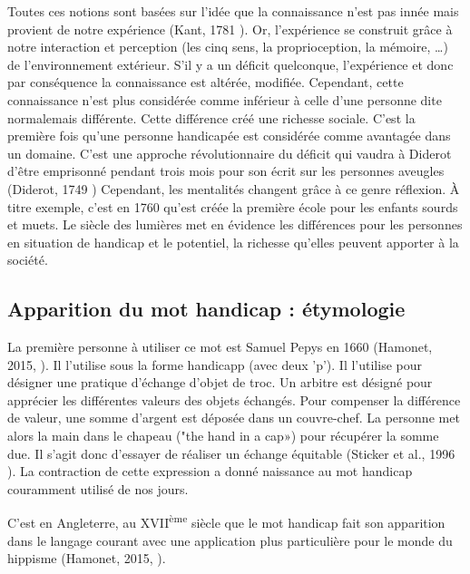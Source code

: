 Toutes ces notions sont basées sur l’idée que la connaissance n’est pas innée mais provient de notre expérience (Kant, 1781 \cite{Kant1781}). Or, l'expérience se construit grâce à notre interaction et perception (les cinq sens, la proprioception, la mémoire, …) de l’environnement extérieur. S’il y a un déficit quelconque, l'expérience et donc par conséquence la connaissance est altérée, modifiée.
Cependant, cette connaissance n’est plus considérée comme inférieur à celle d’une personne dite \og normale\fg mais différente. Cette différence créé une richesse sociale. C’est la première fois qu’une personne handicapée est considérée comme avantagée dans un domaine. C’est une approche révolutionnaire du déficit qui vaudra à Diderot d’être emprisonné pendant trois mois pour son écrit sur les personnes aveugles (Diderot, 1749 \cite{Diderot1749}) Cependant, les mentalités changent grâce à ce genre réflexion. À titre exemple, c'est en 1760 qu'est créée la première école pour les enfants sourds et muets. Le siècle des lumières met en évidence les différences pour les personnes en situation de handicap et le potentiel, la richesse qu'elles peuvent apporter à la société.

\subsection{Apparition du mot \og handicap\fg{} : étymologie}

La première personne à utiliser ce mot est Samuel Pepys en 1660 (Hamonet, 2015, \cite{Hamonet2015}). Il l'utilise sous la forme \og handicapp \fg{} (avec deux 'p'). Il l’utilise pour désigner une pratique d’échange d’objet de troc. Un arbitre est désigné pour apprécier les différentes valeurs des objets échangés. Pour compenser la différence de valeur, une somme d’argent est déposée dans un couvre-chef. La personne met alors la main dans le chapeau ("the hand in a cap») pour récupérer la somme due. Il s'agit donc d'essayer de réaliser un échange équitable (Sticker et al., 1996 \cite{Sticker1996}). La contraction de cette expression a donné naissance au mot \og handicap \fg{} couramment utilisé de nos jours. 

C'est en Angleterre, au XVII\textsuperscript{ème} siècle que le mot \og handicap\fg{} fait son apparition dans le langage courant avec une application plus particulière pour le monde du hippisme (Hamonet, 2015, \cite{Hamonet2015}).



